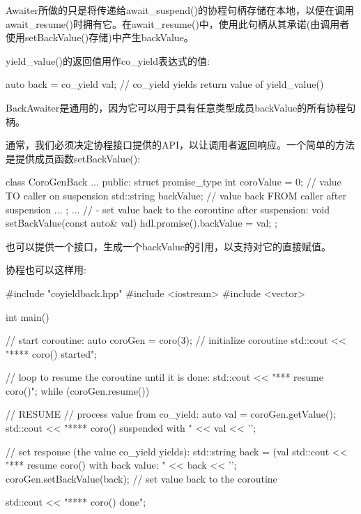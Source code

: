 Awaiter所做的只是将传递给await\_suspend()的协程句柄存储在本地，以便在调用await\_resume()时拥有它。在await\_resume()中，使用此句柄从其承诺(由调用者使用setBackValue()存储)中产生backValue。

yield\_value()的返回值用作co\_yield表达式的值:

\begin{cpp}
auto back = co_yield val; // co_yield yields return value of yield_value()
\end{cpp}

BackAwaiter是通用的，因为它可以用于具有任意类型成员backValue的所有协程句柄。


通常，我们必须决定协程接口提供的API，以让调用者返回响应。一个简单的方法是提供成员函数setBackValue():


\begin{cpp}
class CoroGenBack {
	...
	public:
	struct promise_type {
		int coroValue = 0; // value TO caller on suspension
		std::string backValue; // value back FROM caller after suspension
		...
	};
	...
	// - set value back to the coroutine after suspension:
	void setBackValue(const auto& val) {
		hdl.promise().backValue = val;
	}
};
\end{cpp}

也可以提供一个接口，生成一个backValue的引用，以支持对它的直接赋值。


协程也可以这样用:


\begin{cpp}
#include "coyieldback.hpp"
#include <iostream>
#include <vector>

int main()
{
	// start coroutine:
	auto coroGen = coro(3); // initialize coroutine
	std::cout << "**** coro() started\n";
	
	// loop to resume the coroutine until it is done:
	std::cout << "\n**** resume coro()\n";
	while (coroGen.resume()) { // RESUME
		// process value from co_yield:
		auto val = coroGen.getValue();
		std::cout << "**** coro() suspended with " << val << '\n';
		
		// set response (the value co_yield yields):
		std::string back = (val %
		std::cout << "\n**** resume coro() with back value: " << back << '\n';
		coroGen.setBackValue(back); // set value back to the coroutine
	}
	
	std::cout << "**** coro() done\n";
}
\end{cpp}

